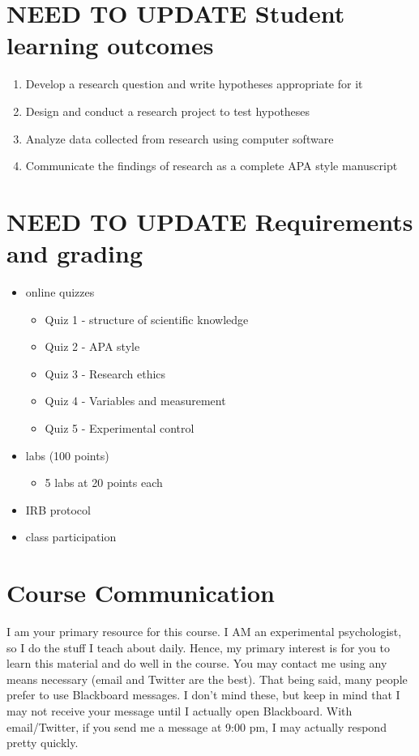 \documentclass[10pt]{article}
\begin{document}
\section*{NEED TO UPDATE Student learning outcomes}
\label{sec-4}

\begin{enumerate}
\item Develop a research question and write hypotheses appropriate for it
\item Design and conduct a research project to test hypotheses
\item Analyze data collected from research using computer software
\item Communicate the findings of research as a complete APA style manuscript
\end{enumerate}

\section*{NEED TO UPDATE Requirements and grading}
\label{sec-5}
\begin{itemize}
\item online quizzes
\begin{itemize}
\item Quiz 1 - structure of scientific knowledge
\item Quiz 2 - APA style
\item Quiz 3 - Research ethics
\item Quiz 4 - Variables and measurement
\item Quiz 5 - Experimental control
\end{itemize}
\item labs (100 points)
\begin{itemize}
\item 5 labs at 20 points each
\end{itemize}
\item IRB protocol
\item class participation
\end{itemize}

\section*{Course Communication}
\label{sec-6}

I am your primary resource for this course. I AM an experimental psychologist, so I do the stuff I teach about daily. Hence, my primary interest is for you to learn this material and do well in the course. You may contact me using any means necessary (email and Twitter are the best). That being said, many people prefer to use Blackboard messages. I don’t mind these, but keep in mind that I may not receive your message until I actually open Blackboard. With email/Twitter, if you send me a message at 9:00 pm, I may actually respond pretty quickly. 
\end{document}
